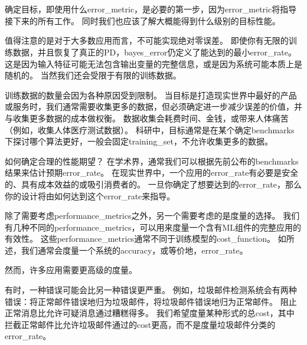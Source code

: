 \section{}
\label{sec:performance_metrics}
确定目标，即使用什么\gls{error_metric}，是必要的第一步，因为\gls{error_metric}将指导接下来的所有工作。
同时我们也应该了解大概能得到什么级别的目标性能。


值得注意的是对于大多数应用而言，不可能实现绝对零误差。
即使你有无限的训练数据，并且恢复了真正的\gls{PD}，\gls{bayes_error}仍定义了能达到的最小\gls{error_rate}。
这是因为输入特征可能无法包含输出变量的完整信息，或是因为系统可能本质上是随机的。
当然我们还会受限于有限的训练数据。

训练数据的数量会因为各种原因受到限制。
当目标是打造现实世界中最好的产品或服务时，我们通常需要收集更多的数据，但必须确定进一步减少误差的价值，并与收集更多数据的成本做权衡。
数据收集会耗费时间、金钱，或带来人体痛苦（例如，收集人体医疗测试数据）。
科研中，目标通常是在某个确定\gls{benchmarks}下探讨哪个算法更好，一般会固定\gls{training_set}，不允许收集更多的数据。


如何确定合理的性能期望？
在学术界，通常我们可以根据先前公布的\gls{benchmarks}结果来估计预期\gls{error_rate}。
在现实世界中，一个应用的\gls{error_rate}有必要是安全的、具有成本效益的或吸引消费者的。
一旦你确定了想要达到的\gls{error_rate}，那么你的设计将由如何达到这个\gls{error_rate}来指导。


除了需要考虑\gls{performance_metrics}之外，另一个需要考虑的是度量的选择。
我们有几种不同的\gls{performance_metrics}，可以用来度量一个含有\gls{ML}组件的完整应用的有效性。
这些\gls{performance_metrics}通常不同于训练模型的\gls{cost_function}。 
如所述，我们通常会度量一个系统的\gls{accuracy}，或等价地，\gls{error_rate}。


然而，许多应用需要更高级的度量。

有时，一种错误可能会比另一种错误更严重。
例如，垃圾邮件检测系统会有两种错误：将正常邮件错误地归为垃圾邮件，将垃圾邮件错误地归为正常邮件。
阻止正常消息比允许可疑消息通过糟糕得多。
我们希望度量某种形式的总\gls{cost}，其中拦截正常邮件比允许垃圾邮件通过的\gls{cost}更高，而不是度量垃圾邮件分类的\gls{error_rate}。


